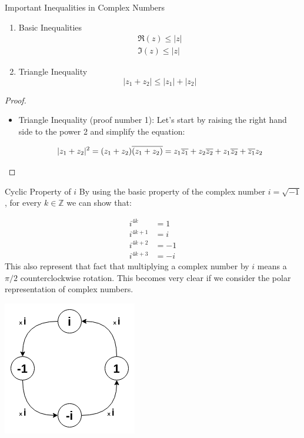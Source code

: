  
\begin{thmbox}{Important Inequalities in Complex Numbers}

	\begin{enumerate}
		\item Basic Inequalities
		\begin{align*}
			\Re(z) \leq |z| \\
			\Im(z) \leq |z|
		\end{align*}
		
		\item Triangle Inequality \[ |z_1 + z_2| \leq |z_1| + |z_2| \]
	\end{enumerate}

\end{thmbox}

\begin{proof}
	\ \\
	\begin{itemize}
	\item Triangle Inequality (proof number 1): Let's start by raising the right hand side to the power 2 and simplify the equation:
	
	\[ |z_1 + z_2|^2 = (z_1 + z_2) \overline{(z_1 + z_2)} = z_1 \overline{z_1} + z_2 \overline{z_2} + z_1 \overline{z_2} + \overline{z_1} z_2 \]
	
	\end{itemize}
\end{proof}


\begin{example}{Cyclic Property of $i$}
	By using the basic property of the complex number $i = \sqrt{-1}$, for every $k \in \mathbb{Z}$ we can show that:
	
	\begin{align*}
		i^{4k} &= 1 \\
		i^{4k+1} &= i \\
		i^{4k+2} &= -1 \\
		i^{4k+3} &= -i
	\end{align*}
	This also represent that fact that multiplying a complex number by $i$ means a $\pi/2$ counterclockwise rotation. This becomes very clear if we consider the polar representation of complex numbers.
	
	\centering
	\includegraphics[scale=0.4]{Images/fig_CyclicProperty.png}

\end{example}



